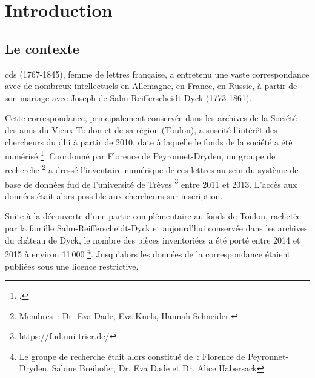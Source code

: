 \documentclass[a4paper,12pt,twoside]{book}
\begin{document}
	\pagestyle{empty}	
	\cleardoublepage
	
	\pagestyle{plain}
	\tableofcontents
	
	\pagestyle{empty}	
	\cleardoublepage
		
	\mainmatter
	
	\pagestyle{plain}
	\chapter*{Introduction}
	
		\section*{Le contexte}
			\gls{cds} (1767-1845), femme de lettres française, a entretenu une vaste correspondance avec de nombreux intellectuels en Allemagne, en France, en Russie, à partir de son mariage avec Joseph de Salm-Reifferscheidt-Dyck (1773-1861).
			
			Cette correspondance, principalement conservée dans les archives de la Société des amis du Vieux Toulon et de sa région (Toulon), a suscité l'intérêt des chercheurs du \gls{dhi} à partir de 2010, date à laquelle le fonds de la société a été numérisé
			\footcite{peyronnet-drydenSalonVirtuelInventaire2012, ProposProjet}. Coordonné par Florence de Peyronnet-Dryden, un groupe de recherche%
			\footnote{Membres~: Dr. Eva Dade, Eva Knels, Hannah Schneider.} %
			a dressé l'inventaire numérique de ces lettres au sein du système de base de données \gls{fud} de l’université de Trèves
			\footnote{\url{https://fud.uni-trier.de/}} %
			entre 2011 et 2013. L'accès aux données était alors possible aux chercheurs sur inscription.%
			
			Suite à la découverte d'une partie complémentaire au fonds de Toulon, rachetée par la famille Salm-Reifferscheidt-Dyck et aujourd'hui conservée dans les archives du château de Dyck, le nombre des pièces inventoriées a été porté entre 2014 et 2015 à environ 11\,000%
			\footnote{Le groupe de recherche était alors constitué de~: Florence de Peyronnet-Dryden, Sabine Breihofer, Dr. Eva Dade et Dr. Alice Habersack}.
			Jusqu'alors les données de la correspondance étaient publiées sous une licence restrictive.
			
\end{document}
